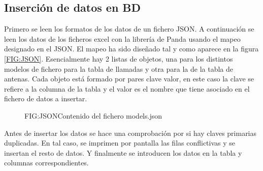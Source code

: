     \subsection{Inserción de datos en BD}
      Primero se leen los formatos de los datos de un fichero JSON.
      A continuación se leen los datos de los ficheros excel con la librería de Panda usando el mapeo designado en el JSON.
      El mapeo ha sido diseñado tal y como aparece en la figura \ref{FIG:JSON}. Esencialmente hay 2 listas de objetos, una para los distintos modelos de fichero para la tabla de llamadas y otra para la de la tabla de antenas.
      Cada objeto está formado por pares clave valor, en este caso la clave se refiere a la columna de la tabla y el valor es el nombre que tiene asociado en el fichero de datos a insertar.
      
      \begin{figure}[Contenido del fichero models.json]{FIG:JSON}{Contenido del fichero models.json}
      \end{figure}

      Antes de insertar los datos se hace una comprobación por si hay claves primarias duplicadas. En tal caso, se imprimen por pantalla las filas conflictivas y se insertan el resto de datos. 
      Y finalmente se introducen los datos en la tabla y columnas correspondientes.
